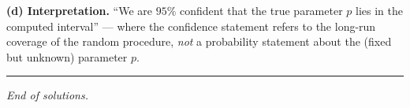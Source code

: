 \documentclass[11pt]{article}
\begin{document}
\textbf{(d) Interpretation.} ``We are $95\%$ confident that the true parameter $p$ lies in the computed interval'' --- where the confidence statement refers to the long-run coverage of the random procedure, \emph{not} a probability statement about the (fixed but unknown) parameter $p$.

\vspace{1em}
\hrule
\begin{center}
\textit{End of solutions.}
\end{center}
\end{document}
